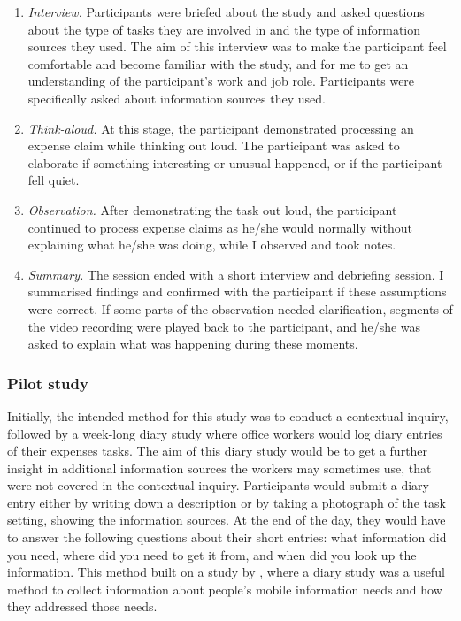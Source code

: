 \begin{enumerate}
\item 
\textit{Interview.} Participants were briefed about the study and asked questions about the type of tasks they are involved in and the type of information sources they used. The aim of this interview was to make the participant feel comfortable and become familiar with the study, and for me to get an understanding of the participant’s work and job role. Participants were specifically asked about information sources they used.
\item 
\textit{Think-aloud.}  At this stage, the participant demonstrated processing an expense claim while thinking out loud. The participant was asked to elaborate if something interesting or unusual happened, or if the participant fell quiet.
\item 
\textit{Observation.}
After demonstrating the task out loud, the participant continued to process expense claims as he/she would normally without explaining what he/she was doing, while I observed and took notes.
\item 
\textit{Summary.} The session ended with a short interview and debriefing session. I summarised findings and confirmed with the participant if these assumptions were correct. If some parts of the observation needed clarification, segments of the video recording were played back to the participant, and he/she was asked to explain what was happening during these moments.
\end{enumerate}

\subsubsection{Pilot study}
Initially, the intended method for this study was to conduct a contextual inquiry, followed by a week-long diary study where office workers would log diary entries of their expenses tasks. The aim of this diary study would be to get a further insight in additional information sources the workers may sometimes use, that were not covered in the contextual inquiry.  Participants would submit a diary entry either by writing down a description or by taking a photograph of the task setting, showing the information sources. At the end of the day, they would have to answer the following questions about their short entries: what information did you need, where did you need to get it from, and when did you look up the information. This method built on a study by \citet{Sohn2008}, where a diary study was a useful method to collect information about people's mobile information needs and how they addressed those needs. 

